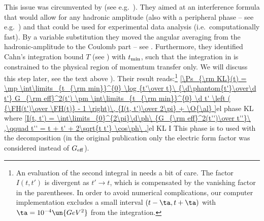 
This issue was circumvented by \KaL{} (see e.g.~). They aimed at an interference formula that would allow for any hadronic amplitude (also with a peripheral phase -- see e.g.~) and that could be used for experimental data analysis (i.e.~computationally fast). By a variable substitution they moved the angular averaging from the hadronic-amplitude to the Coulomb part -- see . Furthermore, they identified Cahn's integration bound $T$ (see ) with $t_{\rm min}$, such that the integration in  is constrained to the physical region of momentum transfer only. We will discuss this step later, see the text above ). Their result reads:\footnote{%
An evaluation of the second integral in  needs a bit of care. The factor $I(t, t')$ is divergent as $t'\to t$, which is compensated by the vanishing factor in the parentheses. In order to avoid numerical complications, our computer implementation excludes a small interval $(t-\ta, t+\ta)$ with $\ta = 10^{-4}\un{GeV^2}$ from the integration.
}
\eqref{\Ps_{\rm KL}(t) =
	\mp \int\limits_{t_{\rm min}}^{0} \log {t'\over t}\ {\d\phantom{t'}\over\d t'} G_{\rm eff}^2(t')
	\pm \int\limits_{t_{\rm min}}^{0} \d t' \left ( {\FH(t')\over \FH(t)} - 1 \right)\, {I(t, t')\over 2\pi}
	+ \O{\al}
}{el phase KL}
where
\eqref{I(t, t') = \int\limits_{0}^{2\pi}\d\ph\ {G_{\rm eff}^2(t'')\over t''}\ ,\qquad t'' = t + t' + 2\sqrt{t t'} \cos\ph\ .}{el KL I}
This phase is to used with the decomposition  (in the original publication  only the electric form factor was considered instead of $G_{\rm eff}$).

